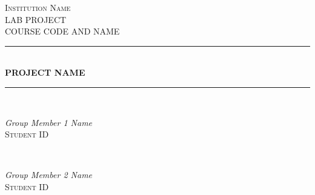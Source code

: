 \begin{titlepage} %
	\newcommand{\HRule}{\rule{\linewidth}{0.5mm}} %
	
	\center %
	
	
	\textsc{\LARGE Institution Name}\\[1.5cm] %
	
	\textsc{\Large LAB PROJECT}\\[0.5cm] %
	
	\textsc{\large COURSE CODE AND NAME}\\[0.5cm] %
	
	
	\HRule\\[0.4cm]
	
	{\huge\bfseries PROJECT NAME}\\[0.4cm] %
	
	\HRule\\[1.5cm]
	
	
	\begin{minipage}{0.4\textwidth}
		\begin{flushleft}
			\large
			\textit{Group Member 1 Name}\\
			\textsc{Student ID} %
		\end{flushleft}
	\end{minipage}
    ~
	\begin{minipage}{0.4\textwidth}
		\begin{flushright}
			\large
			\textit{Group Member 2 Name}\\
			\textsc{Student ID} 
		\end{flushright}
	\end{minipage}
	
	

\end{titlepage}
